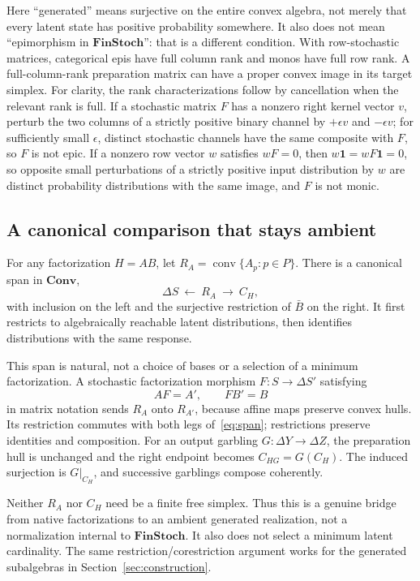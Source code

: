 \documentclass[11pt]{article}
\DeclareMathOperator{\conv}{conv}
\newcommand{\Conv}{\mathbf{Conv}}
\newcommand{\FinStoch}{\mathbf{FinStoch}}
\begin{document}
Here ``generated'' means surjective on the entire convex algebra, not merely that every latent state has positive probability somewhere. It also does not mean ``epimorphism in $\FinStoch$'': that is a different condition. With row-stochastic matrices, categorical epis have full column rank and monos have full row rank. A full-column-rank preparation matrix can have a proper convex image in its target simplex. For clarity, the rank characterizations follow by cancellation when the relevant rank is full. If a stochastic matrix $F$ has a nonzero right kernel vector $v$, perturb the two columns of a strictly positive binary channel by $+\epsilon v$ and $-\epsilon v$; for sufficiently small $\epsilon$, distinct stochastic channels have the same composite with $F$, so $F$ is not epic. If a nonzero row vector $w$ satisfies $wF=0$, then $w\mathbf1=wF\mathbf1=0$, so opposite small perturbations of a strictly positive input distribution by $w$ are distinct probability distributions with the same image, and $F$ is not monic.

\subsection{A canonical comparison that stays ambient}
For any factorization $H=AB$, let $R_A=\conv\{A_p:p\in P\}$. There is a canonical span in $\Conv$,
\begin{equation}
 \Delta S\ \longleftarrow\ R_A\ \longrightarrow\ C_H,
 \label{eq:span}
\end{equation}
with inclusion on the left and the surjective restriction of $\bar B$ on the right. It first restricts to algebraically reachable latent distributions, then identifies distributions with the same response.

This span is natural, not a choice of bases or a selection of a minimum factorization. A stochastic factorization morphism $F:S\to\Delta S'$ satisfying
\[
 AF=A',\qquad FB'=B
\]
in matrix notation sends $R_A$ onto $R_{A'}$, because affine maps preserve convex hulls. Its restriction commutes with both legs of~\eqref{eq:span}; restrictions preserve identities and composition. For an output garbling $G:\Delta Y\to\Delta Z$, the preparation hull is unchanged and the right endpoint becomes $C_{HG}=G(C_H)$. The induced surjection is $G|_{C_H}$, and successive garblings compose coherently.

Neither $R_A$ nor $C_H$ need be a finite free simplex. Thus this is a genuine bridge from native factorizations to an ambient generated realization, not a normalization internal to $\FinStoch$. It also does not select a minimum latent cardinality. The same restriction/corestriction argument works for the generated subalgebras in Section~\ref{sec:construction}.
\end{document}
